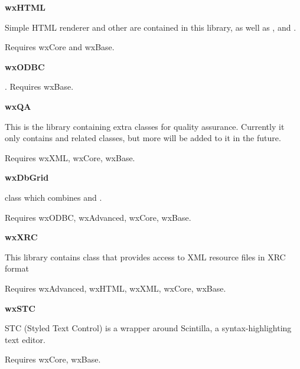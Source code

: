 {\large {\bf wxHTML}}

Simple HTML renderer and other  are
contained in this library, as well as
 ,
  and
 .

Requires wxCore and wxBase.

{\large {\bf wxODBC}}

. Requires wxBase.

{\large {\bf wxQA}}

This is the library containing extra classes for quality assurance. Currently
it only contains  and related classes,
but more will be added to it in the future.

Requires wxXML, wxCore, wxBase.

{\large {\bf wxDbGrid}}

 class which combines 
  and . 

Requires wxODBC, wxAdvanced, wxCore, wxBase.

{\large {\bf wxXRC}}

This library contains  class that
provides access to XML resource files in XRC format

Requires wxAdvanced, wxHTML, wxXML, wxCore, wxBase.

{\large {\bf wxSTC}}

STC (Styled Text Control) is a wrapper around Scintilla, a syntax-highlighting text editor.

Requires wxCore, wxBase.
